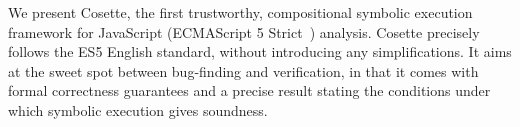 \documentclass[acmsmall,review,anonymous]{acmart}\settopmatter{printfolios=true,printccs=false,printacmref=false}
\newcommand{\jsil}{JSIL\xspace}
\newcommand{\jilette}{Cosette\xspace}
\newcommand{\pmaxinline}[1]{ {\color{blue} *** PM : #1 ***} }
\newif\ifComments
\newcommand{\pmax}[1]{%
\ifComments
\begin{center}
\fbox{\begin{minipage}{0.95\textwidth} \color{blue}
{\rm PM: \small #1}
\end{minipage}}
\end{center}
\fi}
\begin{document}
We present \jilette, the first trustworthy, compositional symbolic execution framework for JavaScript (ECMAScript 5 Strict~\cite{ecma}) analysis. \jilette precisely follows the ES5 English standard, without introducing any simplifications. 
It aims at the sweet spot between bug-finding and verification, 
in that it comes with formal correctness guarantees and a precise result stating the conditions under which symbolic execution gives soundness. 








\end{document}
